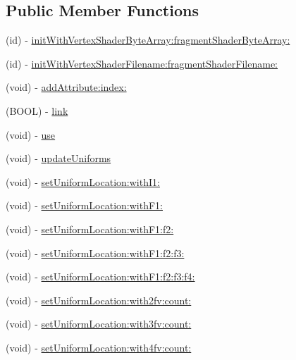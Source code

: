 \subsection*{Public Member Functions}
\begin{DoxyCompactItemize}
\item 
(id) -\/ \hyperlink{interface_c_c_g_l_program_a196edfd2692a59302aac9b13bff1cbee}{init\-With\-Vertex\-Shader\-Byte\-Array\-:fragment\-Shader\-Byte\-Array\-:}
\item 
(id) -\/ \hyperlink{interface_c_c_g_l_program_ade25f9a8a3e0f6fda06e0326c239b877}{init\-With\-Vertex\-Shader\-Filename\-:fragment\-Shader\-Filename\-:}
\item 
(void) -\/ \hyperlink{interface_c_c_g_l_program_a5148246bb5931a47e07eafe9b8d3b891}{add\-Attribute\-:index\-:}
\item 
(B\-O\-O\-L) -\/ \hyperlink{interface_c_c_g_l_program_a595071a9b680374e23f1cd93b5b1fda7}{link}
\item 
(void) -\/ \hyperlink{interface_c_c_g_l_program_a10ff7a477f3cf4a4085b415f88921e01}{use}
\item 
(void) -\/ \hyperlink{interface_c_c_g_l_program_a9ad6bb937bd9ca7c8bb0dbfd21b3cd8a}{update\-Uniforms}
\item 
(void) -\/ \hyperlink{interface_c_c_g_l_program_a98528f310d68740dfc4a1f8ec6ad063c}{set\-Uniform\-Location\-:with\-I1\-:}
\item 
(void) -\/ \hyperlink{interface_c_c_g_l_program_a91c55a8808fdb0dde12aaa07fd7762f9}{set\-Uniform\-Location\-:with\-F1\-:}
\item 
(void) -\/ \hyperlink{interface_c_c_g_l_program_aa4d91f3af30a817a0a9bc96353e10900}{set\-Uniform\-Location\-:with\-F1\-:f2\-:}
\item 
(void) -\/ \hyperlink{interface_c_c_g_l_program_aac05353cce6f4f8dba00eab5029c3fb2}{set\-Uniform\-Location\-:with\-F1\-:f2\-:f3\-:}
\item 
(void) -\/ \hyperlink{interface_c_c_g_l_program_a65c5d76b225f41939489c846071c3a06}{set\-Uniform\-Location\-:with\-F1\-:f2\-:f3\-:f4\-:}
\item 
(void) -\/ \hyperlink{interface_c_c_g_l_program_a2938f2e5f966e6c58155954c9b942173}{set\-Uniform\-Location\-:with2fv\-:count\-:}
\item 
(void) -\/ \hyperlink{interface_c_c_g_l_program_a6fb1eafbc2ff546d3c7f804448b9551c}{set\-Uniform\-Location\-:with3fv\-:count\-:}
\item 
(void) -\/ \hyperlink{interface_c_c_g_l_program_a7ac9cdbed7bd66436f20b0f42edb6e06}{set\-Uniform\-Location\-:with4fv\-:count\-:}

\end{DoxyCompactItemize}
